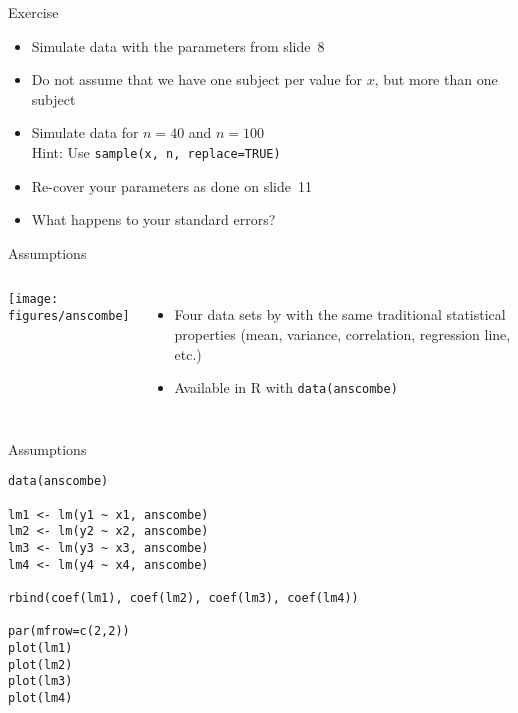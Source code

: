\documentclass{beamer}
\begin{document}
\begin{frame}{}
  \begin{block}{Exercise}
    \begin{itemize}
      \item Simulate data with the parameters from slide~8
      \item Do not assume that we have one subject per value for $x$, but
        more than one subject
      \item Simulate data for $n=40$ and $n=100$\\
        Hint: Use \texttt{sample(x, n, replace=TRUE)}
      \item Re-cover your parameters as done on slide~11
      \item What happens to your standard errors?
    \end{itemize}
  \end{block}
\end{frame}

\begin{frame}{Assumptions}
  \begin{columns}
    \texttt{[image: figures/anscombe]} 
  \begin{itemize}
    \item Four data sets by \citet{Anscombe1973} with the same traditional
      statistical properties (mean, variance, correlation, regression line,
      etc.)
    \item Available in R with \texttt{data(anscombe)}
  \end{itemize}
  \end{columns}
\end{frame}

{

\begin{frame}[fragile]{Assumptions}
\begin{lstlisting}
data(anscombe)

lm1 <- lm(y1 ~ x1, anscombe)
lm2 <- lm(y2 ~ x2, anscombe)
lm3 <- lm(y3 ~ x3, anscombe)
lm4 <- lm(y4 ~ x4, anscombe)

rbind(coef(lm1), coef(lm2), coef(lm3), coef(lm4))

par(mfrow=c(2,2))
plot(lm1)
plot(lm2)
plot(lm3)
plot(lm4)
\end{lstlisting}
\end{frame}

}
\end{document}

